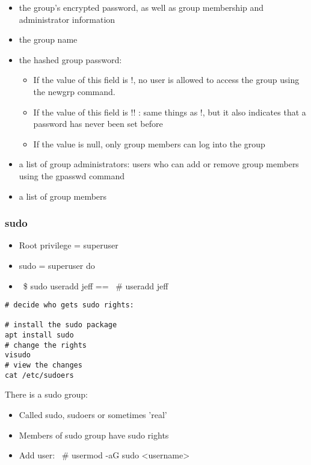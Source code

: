\documentclass{article}
\begin{document}
\begin{itemize}
    \item the group's encrypted password, as well as group membership and administrator information
    \item the group name
    \item the hashed group password: 
    \begin{itemize}
        \item If the value of this field is !, no user is allowed to access the group using the newgrp command. 
        \item If the value of this field is !! : same things as !, but it also indicates that a password has never been set before
        \item If the value is null, only group members can log into the group
    \end{itemize}
    \item a list of group administrators: users who can add or remove group members using the gpasswd command
    \item a list of group members
\end{itemize}

\subsubsection{sudo}

\begin{itemize}
    \item Root privilege = superuser
    \item sudo = superuser do
    \item ~\$ sudo useradd jeff == ~\# useradd jeff
\end{itemize}

\begin{verbatim}
# decide who gets sudo rights:

# install the sudo package
apt install sudo
# change the rights
visudo
# view the changes
cat /etc/sudoers
\end{verbatim}

There is a sudo group:

\begin{itemize}
    \item Called sudo, sudoers or sometimes 'real'
    \item Members of sudo group have sudo rights
    \item Add user: ~\# usermod -aG sudo <username>
\end{itemize}
\end{document}
